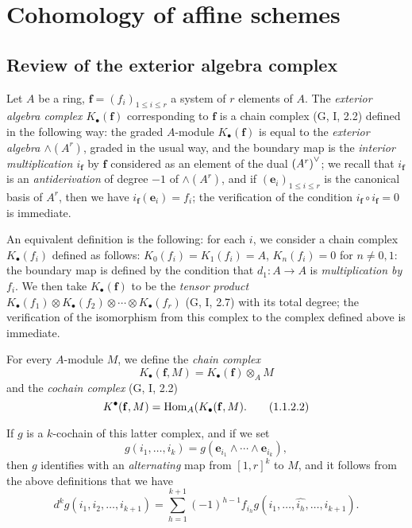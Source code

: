 \section{Cohomology of affine schemes}
\label{section:III.1}

\subsection{Review of the exterior algebra complex}
\label{subsection:III.1.1}

\begin{env}[1.1.1]
\label{III.1.1.1}
Let $A$ be a ring, $\mathbf{f}=(f_i)_{1\leq i\leq r}$ a system of $r$ elements of $A$.
The \emph{exterior algebra complex $K_\bullet(\mathbf{f})$} corresponding to $\mathbf{f}$ is a chain complex (G, I, 2.2) defined in the following way: the graded $A$-module $K_\bullet(\mathbf{f})$ is equal to the \emph{exterior algebra $\wedge(A^r)$}, graded in the usual way, and the boundary map is the \emph{interior multiplication $i_\mathbf{f}$} by $\mathbf{f}$ considered as an element of the dual ${(A^r)}^\vee$; we recall that $i_\mathbf{f}$ is an \emph{antiderivation} of degree $-1$ of $\wedge(A^r)$, and if $(\mathbf{e}_i)_{1\leq i\leq r}$ is the canonical basis of $A^r$, then we have $i_\mathbf{f}(\mathbf{e}_i)=f_i$; the verification of the condition $i_\mathbf{f}\circ i_\mathbf{f}=0$ is immediate.

An equivalent definition is the following: for each $i$, we consider a chain complex $K_\bullet(f_i)$ defined as follows: $K_0(f_i)=K_1(f_i)=A$, $K_n(f_i)=0$ for $n\neq 0,1$: the boundary map is defined by the condition that $d_1:A\to A$ is \emph{multiplication by $f_i$}.
We then take $K_\bullet(\mathbf{f})$ to be the \emph{tensor product $K_\bullet(f_1)\otimes K_\bullet(f_2)\otimes\cdots\otimes K_\bullet(f_r)$} (G, I, 2.7) with its total degree; the verification of the isomorphism from this complex to the complex defined above is immediate.
\end{env}

\begin{env}[1.1.2]
\label{III.1.1.2}
For every $A$-module $M$, we define the \emph{chain complex}
\[
\label{III.1.1.2.1}
  K_\bullet(\mathbf{f},M)=K_\bullet(\mathbf{f})\otimes_A M
  \tag{1.1.2.1}
\]
and the \emph{cochain complex} (G, I, 2.2)
\[
\label{III.1.1.2.2}
  K^\bullet(\mathbf{f},M)=\operatorname{Hom}_A(K_\bullet(\mathbf{f},M).
  \tag{1.1.2.2}
\]

If $g$ is a $k$-cochain of this latter complex, and if we set
\[
  g(i_1,\dots,i_k)=g(\mathbf{e}_{i_1}\wedge\cdots\wedge\mathbf{e}_{i_k}),
\]
then $g$ identifies with an \emph{alternating} map from $[1,r]^k$ to $M$, and it follows from the above definitions that we have
\[
\label{III.1.1.2.3}
  d^k g(i_1,i_2,\dots,i_{k+1})=\sum_{h=1}^{k+1}(-1)^{h-1}f_{i_h}g(i_1,\dots,\widehat{i_h},\dots,i_{k+1}).
  \tag{1.1.2.3}
\]
\end{env}


